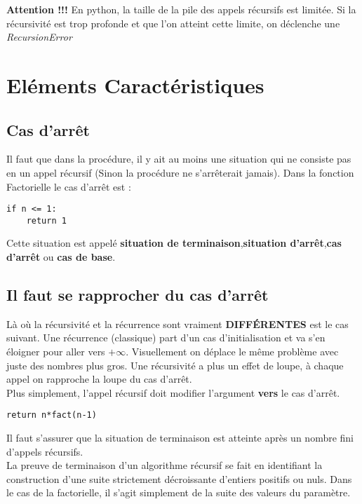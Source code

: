 \documentclass[12pt,fleqn]{book} %
\begin{document}
\begin{remark}
	\textbf{Attention !!!} En python, la taille de la pile des appels récursifs est limitée. Si la récursivité est trop profonde et que l'on atteint cette limite, on déclenche une \textit{RecursionError}
\end{remark}

\section{Eléments Caractéristiques}

\subsection{Cas d'arrêt}

Il faut que dans la procédure, il y ait au moins une situation qui ne consiste pas en un appel récursif (Sinon la procédure ne s'arrêterait jamais). Dans la fonction Factorielle le cas d'arrêt est :


\begin{center}
	\begin{varwidth}[t]{.5\textwidth}
		\begin{lstlisting}[language=iPython,linewidth = 12cm]
if n <= 1:
	return 1
\end{lstlisting}
\end{varwidth}\end{center}

Cette situation est appelé \textbf{situation de terminaison},\textbf{situation d'arrêt},\textbf{cas d'arrêt} ou \textbf{cas de base}.

\subsection{Il faut se rapprocher du cas d'arrêt}

Là où la récursivité et la récurrence sont vraiment \textbf{DIFFÉRENTES} est le cas suivant. Une récurrence (classique) part d'un cas d'initialisation et va s'en éloigner pour aller vers $+\infty$. Visuellement on déplace le même problème avec juste des nombres plus gros. Une récursivité a plus un effet de loupe, à chaque appel on rapproche la loupe du cas d'arrêt. \\
Plus simplement, l'appel récursif doit modifier l'argument \textbf{vers} le cas d'arrêt.
\begin{center}
	\begin{varwidth}[t]{.5\textwidth}
		\begin{lstlisting}[language=iPython,linewidth = 12cm]
return n*fact(n-1)\end{lstlisting}
\end{varwidth}\end{center}
Il faut s'assurer que la situation de terminaison est atteinte après un nombre fini d'appels récursifs. \\

La preuve de terminaison d'un algorithme récursif se fait en identifiant la construction d'une suite strictement décroissante d'entiers positifs ou nuls. Dans le cas de la factorielle, il s'agit simplement de la suite des valeurs du paramètre.
\end{document}
